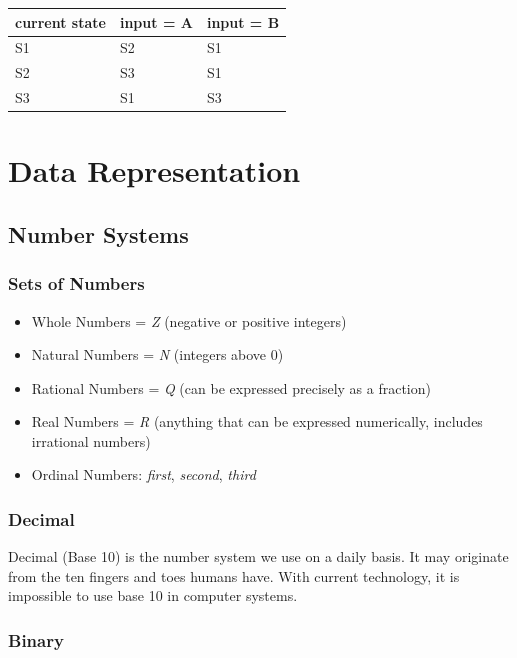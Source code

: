 \documentclass[9pt]{article}
\let\oldsection\section
\renewcommand\section{\clearpage\oldsection}
\begin{document}
\begin{center}
\begin{tabular}{lll}
\hline
current state & input = A & input = B\\
\hline
S1 & S2 & S1\\
S2 & S3 & S1\\
S3 & S1 & S3\\
\hline
\end{tabular}
\end{center}

\section{Data Representation}
\label{sec:org38e6ca8}
\subsection{Number Systems}
\label{sec:org149124f}
\subsubsection{Sets of Numbers}
\label{sec:orgc602f43}

\begin{itemize}
\item Whole Numbers = \emph{Z} (negative or positive integers)
\item Natural Numbers = \emph{N} (integers above 0)
\item Rational Numbers = \emph{Q} (can be expressed precisely as a fraction)
\item Real Numbers = \emph{R} (anything that can be expressed numerically, includes irrational numbers)
\item Ordinal Numbers: \emph{first}, \emph{second}, \emph{third}
\end{itemize}

\subsubsection{Decimal}
\label{sec:orgf9eaa0c}

Decimal (Base 10) is the number system we use on a daily basis. It may originate from the ten fingers and toes humans have. With current technology, it is impossible to use base 10 in computer systems.

\subsubsection{Binary}
\label{sec:orgb8454ed}
\end{document}

